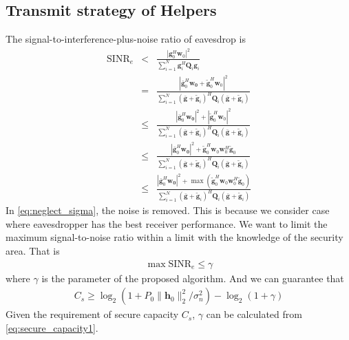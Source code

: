 \documentclass[conference]{IEEEtran}
\begin{document}
\subsection{Transmit strategy of Helpers}
The signal-to-interference-plus-noise ratio of eavesdrop is
\begin{eqnarray}
\mathrm{SINR}_e & < & \frac{\left| \mathbf{g}_{0}^H\mathbf{w}_{0}\right|^2}{\sum_{i=1}^{N}\mathbf{g}_{i}^H\mathbf{Q}_{i}\mathbf{g}_i} \label{eq:neglect_sigma}\\
&=& \frac{|\bar{\mathbf{g}}_0^H\mathbf{w_0} + \tilde{\mathbf{g}}_0^H\mathbf{w}_0|^2}{\sum_{i = 1}^N(\bar{\mathbf{g}}+\tilde{\mathbf{g}}_i)^H\mathbf{Q}_i(\bar{\mathbf{g}}+\tilde{\mathbf{g}}_i)}\\
&\leq & \frac{|\bar{\mathbf{g}}_0^H\mathbf{w_0}|^2 + |\tilde{\mathbf{g}}_0^H\mathbf{w}_0|^2}{\sum_{i = 1}^N(\bar{\mathbf{g}}+\tilde{\mathbf{g}}_i)^H\mathbf{Q}_i(\bar{\mathbf{g}}+\tilde{\mathbf{g}}_i)}\\
&\leq & \frac{|\bar{\mathbf{g}}_0^H\mathbf{w_0}|^2 + \tilde{\mathbf{g}}_0^H\mathbf{w}_0\mathbf{w}_0^H\tilde{\mathbf{g}}_0}{\sum_{i = 1}^N(\bar{\mathbf{g}}+\tilde{\mathbf{g}}_i)^H\mathbf{Q}_i(\bar{\mathbf{g}}+\tilde{\mathbf{g}}_i)}\\
& \leq & \frac{|\bar{\mathbf{g}}_0^H\mathbf{w_0}|^2 + \max(\tilde{\mathbf{g}}_0^H\mathbf{w}_0\mathbf{w}_0^H\tilde{\mathbf{g}}_0)}{\sum_{i = 1}^N(\bar{\mathbf{g}}+\tilde{\mathbf{g}}_i)^H\mathbf{Q}_i(\bar{\mathbf{g}}+\tilde{\mathbf{g}}_i)} 
\label{eq:SINR_e}
\end{eqnarray}
In \eqref{eq:neglect_sigma}, the noise is removed. This is because we consider case where eavesdropper has the best receiver performance. We want to limit the maximum signal-to-noise ratio within a limit with the knowledge of the security area. That is 
\begin{eqnarray}
\max \mathrm{SINR}_e \leq \gamma \label{eq:SINR_constraint}
\end{eqnarray} 
where $\gamma$ is the parameter of the proposed algorithm.
And we can guarantee that
\begin{eqnarray}
C_s \geq \log_2\left(1 + P_0\|\mathbf{h}_0\|_2^2/\sigma_n^2\right) - \log_2\left(1 + \gamma\right) \label{eq:secure_capacity1}
\end{eqnarray}
Given the requirement of secure capacity $C_s$, $\gamma$ can be calculated from \eqref{eq:secure_capacity1}.
\end{document}
